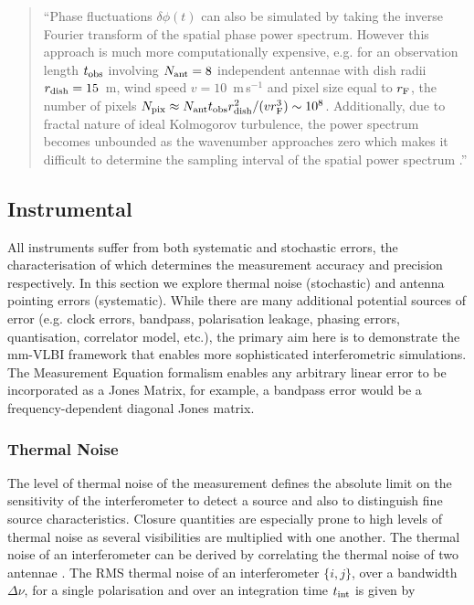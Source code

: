 \begin{quotation}
``Phase fluctuations $\delta\phi(t)$ can also be simulated by taking the inverse Fourier transform of the spatial phase power spectrum. However this approach is much more computationally expensive, e.g. for an observation length $t_{\rm obs}$ involving $N_{\rm ant}=8$ independent antennae with dish radii $r_{\rm dish}=15$~m, wind speed $v=10$~m\,s$^{-1}$ and pixel size equal to $r_{\rm F}$, the number of pixels $N_{\rm pix} \approx N_{\rm ant} t_{\rm obs} r_{\rm dish}^2/(v r_{\rm F}^3)  \sim 10^8$. Additionally, due to fractal nature of ideal Kolmogorov turbulence, the power spectrum becomes unbounded as the wavenumber approaches zero which makes it difficult to determine the sampling interval of the spatial power spectrum \citep{Lane_1992}.''\\
\citep{Blecher_2016}
\end{quotation}

\subsection{Instrumental}

All instruments suffer from both systematic and stochastic errors, the characterisation of which determines the measurement accuracy and precision respectively. In this section we explore thermal noise (stochastic) and antenna pointing errors (systematic). 
While there are many additional potential sources of error (e.g. clock errors, bandpass, polarisation leakage, phasing errors, quantisation, correlator model, etc.), the primary aim here is to demonstrate the mm-VLBI framework that enables more sophisticated interferometric simulations. The Measurement Equation formalism enables any arbitrary linear error to be incorporated as a Jones Matrix, for example, a bandpass error would be a frequency-dependent diagonal Jones matrix.

\subsubsection{Thermal Noise}


The level of thermal noise of the measurement defines the absolute limit on the sensitivity of the interferometer to detect a source and also to distinguish fine source characteristics. Closure quantities are especially prone to high levels of thermal noise as several visibilities are multiplied with one another. The thermal noise of an interferometer can be derived by correlating the thermal noise of two antennae \citep*{Wrobel_1999}. The  RMS thermal noise of an interferometer $\{i,j\}$, over a bandwidth $\Delta \nu$, for a single polarisation and over an integration time $t_{\rm int}$ is given by 

